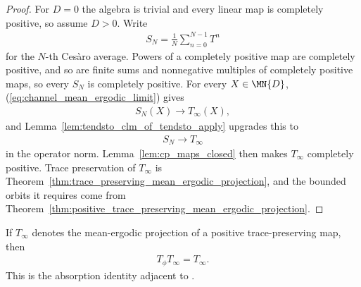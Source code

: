 \begin{proof}\leanok
    For $D=0$ the algebra is trivial and every linear map is completely
    positive, so assume $D>0$. Write
    \begin{align}
        S_N=\frac{1}{N}\sum_{n=0}^{N-1}T^n
    \end{align}
    for the $N$-th Ces\`aro average. Powers of a completely positive map are
    completely positive, and so are finite sums and nonnegative multiples of
    completely positive maps, so every $S_N$ is completely positive. For every
    $X\in\MN{D}$, (\ref{eq:channel_mean_ergodic_limit}) gives
    \begin{align}
        S_N(X)\longrightarrow T_\infty(X),
    \end{align}
    and Lemma~\ref{lem:tendsto_clm_of_tendsto_apply} upgrades this to
    \begin{align}
        S_N\longrightarrow T_\infty
    \end{align}
    in the operator norm. Lemma~\ref{lem:cp_maps_closed} then makes $T_\infty$
    completely positive. Trace preservation of $T_\infty$ is
    Theorem~\ref{thm:trace_preserving_mean_ergodic_projection}, and the
    bounded orbits it requires come from
    Theorem~\ref{thm:positive_trace_preserving_mean_ergodic_projection}.
\end{proof}

\begin{theorem}
    \label{thm:peripheral_mean_ergodic_absorption}
    \leanok
    If $T_\infty$ denotes the mean-ergodic projection of a positive
    trace-preserving map, then
    \begin{align}
        T_\phi T_\infty=T_\infty.
    \end{align}
    This is the absorption identity adjacent to
    \cite[Equation~(6.14)]{Wolf2012Quantum}.
\end{theorem}


